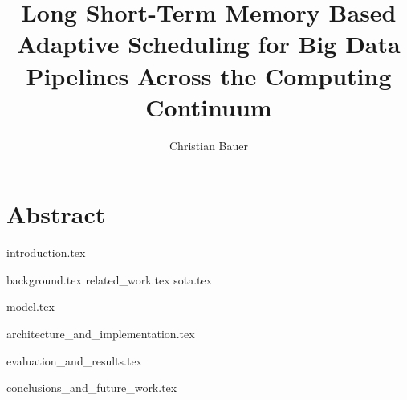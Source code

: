 \documentclass[
a4paper, %
11pt, %
onecolumn, %
openany, %
]{memoir}
\title{Long Short-Term Memory Based Adaptive Scheduling for Big Data Pipelines Across the Computing Continuum}
\author{Christian Bauer}
\begin{document}
  \maketitle

  \tableofcontents
  \listoffigures
  \listoftables
  \lstlistoflistings

  \section*{Abstract}   


  {introduction.tex}

  {background.tex}
  {related_work.tex}
  {sota.tex}

  {model.tex}

  {architecture_and_implementation.tex}
  
  {evaluation_and_results.tex}

  {conclusions_and_future_work.tex}


  
  
\end{document}
